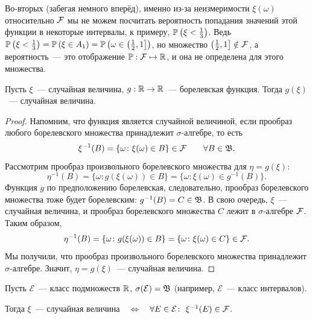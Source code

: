 \begin{exmp}
Во-вторых (забегая немного вперёд), именно из-за неизмеримости $\xi(\omega)$ относительно $\mathcal{F}$ мы не можем посчитать вероятность попадания значений этой функции в некоторые интервалы, к примеру, $\operatorname{\mathbb{P}}\left({\xi < \frac{1}{3}}\right)$. 
Ведь $\operatorname{\mathbb{P}}\left(\xi < \frac{1}{3} \right) = \operatorname{\mathbb{P}}\left(\xi \in A_1\right) = \operatorname{\mathbb{P}}\left(\omega \in \left(\frac{1}{2}, 1\right] \right)$, но множество $\left(\frac{1}{2}, 1\right] \notin \mathcal{F}$, 
а вероятность~--- это отображение $\operatorname{\mathbb{P}}: \mathcal{F} \mapsto \mathbb{R}$, и она не определена для этого множества.
\end{exmp} 

\begin{thm*}
    Пусть $\xi$~--- случайная величина, $g: \mathbb{R} \to \mathbb{R}$~--- борелевская функция. 
    Тогда $g(\xi)$~--- случайная величина.
\end{thm*}

\begin{proof}
    Напомним, что функция является случайной величиной, если прообраз любого борелевского множества принадлежит $\sigma$-алгебре, то есть
    \begin{equation*}
        \xi^{-1}(B) = \{\omega \colon \xi(\omega) \in B \} \in \mathcal{F} \qquad \forall B \in \mathfrak{B}.
    \end{equation*}
    Рассмотрим прообраз произвольного борелевского множества для $\eta = g(\xi)$:
    \begin{equation*}
        \eta^{-1}(B) = \{\omega \colon g(\xi(\omega)) \in B \} = \{\omega \colon \xi(\omega) \in g^{-1}(B)\}.
    \end{equation*}
    Функция $g$ по предположению борелевская, следовательно, прообраз борелевского множества тоже будет борелевским: $g^{-1}(B) = C \in \mathfrak{B}$. 
    В свою очередь, $\xi$~--- случайная величина, и прообраз борелевского множества $C$ лежит в $\sigma$-алгебре $\mathcal{F}$. 
    Таким образом, 
    \begin{equation*}
        \eta^{-1}(B) = \{\omega \colon g(\xi(\omega)) \in B \} = \{\omega \colon \xi(\omega) \in C \} \in \mathcal{F}.
    \end{equation*}
    Мы получили, что прообраз произвольного борелевского множества принадлежит $\sigma$-алгебре. 
    Значит, $\eta = g(\xi)$~--- случайная величина.
\end{proof}

\begin{thm*}
    Пусть $\mathcal{E}$~--- класс подмножеств $\mathbb{R}$, $\sigma(\mathcal{E}) = \mathfrak{B}$ (например, $\mathcal{E}$~--- класс интервалов).

    Тогда $\xi$~--- случайная величина\ \ $\iff$\ \ $\forall E \in \mathcal{E}\colon ~\xi^{-1}(E) \in \mathcal{F}$.
\end{thm*}

